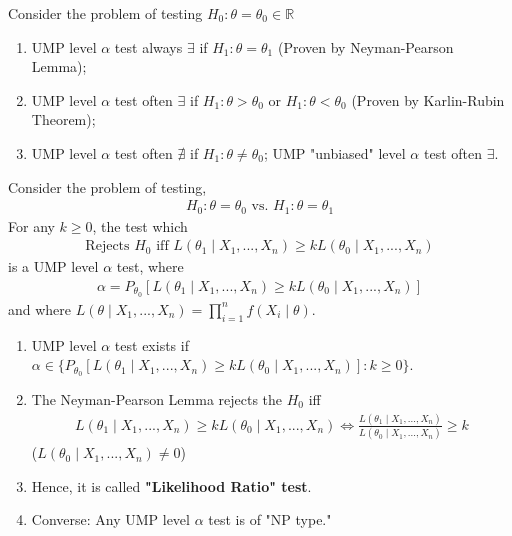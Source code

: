 \documentclass[11pt]{elegantbook}
\begin{document}
Consider the problem of testing $H_0:\theta=\theta_0\in \mathbb{R}$
\begin{enumerate}[$\circ$]
    \item UMP level $\alpha$ test always $\exists$ if $H_1:\theta=\theta_1$ (Proven by Neyman-Pearson Lemma);
    \item UMP level $\alpha$ test often $\exists$ if $H_1:\theta>\theta_0$ or $H_1:\theta<\theta_0$ (Proven by Karlin-Rubin Theorem);
    \item UMP level $\alpha$ test often $\nexists$ if $H_1:\theta\neq \theta_0$; UMP "unbiased" level $\alpha$ test often $\exists$.
\end{enumerate}
\begin{theorem}\label{NP_lemma}
    Consider the problem of testing,
    \begin{equation}
        \begin{aligned}
            H_0:\theta=\theta_0 \text{ vs. }H_1:\theta=\theta_1
        \end{aligned}
        \nonumber
    \end{equation}
    For any $k\geq 0$, the test which
    \begin{equation}
        \begin{aligned}
            \text{Rejects $H_0$ iff }L(\theta_1\mid X_1,...,X_n)\geq k L(\theta_0\mid X_1,...,X_n)
        \end{aligned}
        \nonumber
    \end{equation}
    is a UMP level $\alpha$ test, where
    \begin{equation}
        \begin{aligned}
            \alpha=P_{\theta_0}[L(\theta_1\mid X_1,...,X_n)\geq k L(\theta_0\mid X_1,...,X_n)]
        \end{aligned}
        \nonumber
    \end{equation}
    and where $L(\theta\mid X_1,...,X_n)=\prod_{i=1}^n f(X_i\mid\theta)$.
\end{theorem}
\begin{remark}
    \begin{enumerate}[$\circ$]
        \item UMP level $\alpha$ test exists if $\alpha\in \{P_{\theta_0}[L(\theta_1\mid X_1,...,X_n)\geq k L(\theta_0\mid X_1,...,X_n)]:k\geq 0\}$.
        \item The Neyman-Pearson Lemma rejects the $H_0$ iff
        \begin{equation}
            \begin{aligned}
                L(\theta_1\mid X_1,...,X_n)\geq k L(\theta_0\mid X_1,...,X_n)\Leftrightarrow \frac{L(\theta_1\mid X_1,...,X_n)}{L(\theta_0\mid X_1,...,X_n)}\geq k
            \end{aligned}
            \nonumber
        \end{equation}
        ($L(\theta_0\mid X_1,...,X_n)\neq 0$)
        \item Hence, it is called \textbf{"Likelihood Ratio" test}.
        \item Converse: Any UMP level $\alpha$ test is of "NP type."
    \end{enumerate}
\end{remark}
\end{document}
